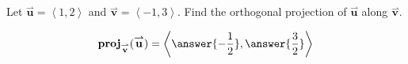 \documentclass{ximera}
\author{Gregory Hartman \and Matthew Carr}
\begin{document}
\begin{exercise}

Let $\overset{\boldsymbol{\rightharpoonup}}{\mathbf{u}} = \left< 1,2 \right>$ and $\overset{\boldsymbol{\rightharpoonup}}{\mathbf{v}} = \left< -1,3 \right>$. Find the
orthogonal projection of $\overset{\boldsymbol{\rightharpoonup}}{\mathbf{u}}$ along $\overset{\boldsymbol{\rightharpoonup}}{\mathbf{v}}$.
\begin{prompt}
\[
\mathbf{proj}_{\overset{\boldsymbol{\rightharpoonup}}{\mathbf{v}}}(\overset{\boldsymbol{\rightharpoonup}}{\mathbf{u}})= \left< \answer{-\frac{1}{2}},\answer{\frac{3}{2}} \right>
\]
\end{prompt}

\end{exercise}
\end{document}

